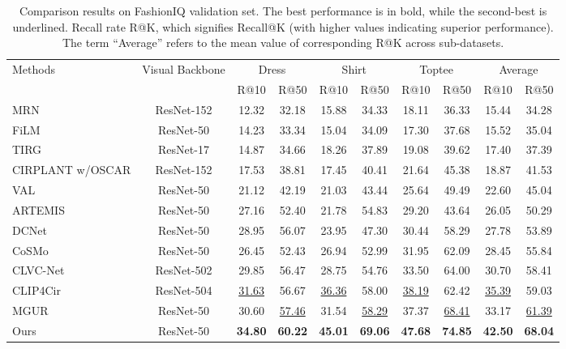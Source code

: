 \documentclass[letterpaper]{article} \usepackage{aaai24}  \usepackage{times}  \usepackage{helvet}  \usepackage{courier}  \usepackage[hyphens]{url}  \usepackage{graphicx} \urlstyle{rm} \def\UrlFont{\rm}  \usepackage{natbib}  \usepackage{caption} \frenchspacing  \setlength{\pdfpagewidth}{8.5in} \setlength{\pdfpageheight}{11in} \usepackage{amsmath,amsfonts}
\begin{document}
\begin{table*}[htb]
\centering
\small
    \begin{tabular}{l|c|cccccc|cc}
    \toprule
    \multirow{2}{*}{Methods} & \multirow{2}{*}{Visual Backbone} & \multicolumn{2}{c}{Dress} & \multicolumn{2}{c}{Shirt} & \multicolumn{2}{c}{Toptee} & \multicolumn{2}{|c}{Average}\\
    \cmidrule{3-4} \cmidrule{5-6} \cmidrule{7-8} \cmidrule{9-10}
    \multirow{2}{*}{} & \multirow{2}{*}{} &  R@10 & R@50 & R@10 & R@50 & R@10 & R@50 & R@10 & R@50\\
    \midrule
    MRN \cite{MRN} & ResNet-152 & 12.32 & 32.18 & 15.88 & 34.33 & 18.11 & 36.33 & 15.44 & 34.28 \\
    FiLM \cite{perez2018film} & ResNet-50 & 14.23 & 33.34 & 15.04 & 34.09 & 17.30 & 37.68 & 15.52 & 35.04 \\
    TIRG \cite{TIRG} & ResNet-17 & 14.87 & 34.66 & 18.26 & 37.89 & 19.08 & 39.62 & 17.40 & 37.39 \\
    CIRPLANT w/OSCAR \cite{liu2021image} & ResNet-152 & 17.53 & 38.81 & 17.45 & 40.41 & 21.64 & 45.38 & 18.87 & 41.53 \\
    VAL \cite{Chen_2020_CVPR} & ResNet-50 & 21.12 & 42.19 & 21.03 & 43.44 & 25.64 & 49.49 & 22.60 & 45.04 \\
    ARTEMIS \cite{delmas2022artemis} & ResNet-50 & 27.16 & 52.40 & 21.78 & 54.83 & 29.20 & 43.64 & 26.05 & 50.29 \\
    DCNet \cite{kim:2021:AAAI} & ResNet-50 & 28.95 & 56.07 & 23.95 & 47.30 & 30.44 & 58.29 & 27.78 & 53.89 \\
    CoSMo \cite{2021CoSMo} & ResNet-50 & 26.45 & 52.43 & 26.94 & 52.99 & 31.95 & 62.09 & 28.45 & 55.84 \\
    CLVC-Net \cite{CLVC-Net} & ResNet-502 & 29.85 & 56.47 & 28.75 & 54.76 & 33.50 & 64.00 & 30.70 & 58.41 \\
    CLIP4Cir \cite{Baldrati2022combiner} & ResNet-504 & \underline{31.63} & 56.67 & \underline{36.36} & 58.00 & \underline{38.19} & 62.42 & \underline{35.39} & 59.03 \\
    MGUR \cite{chen2022composed} & ResNet-50 & {{30.60}} & \underline{{57.46}} & {31.54} & \underline{58.29} & {{37.37}} & \underline{{68.41}} & {{33.17}} & \underline{{61.39}}\\
    \midrule
Ours & ResNet-50 & \textbf{{34.80}} & \textbf{{60.22}} & \textbf{45.01} & \textbf{69.06} & \textbf{{47.68}} & \textbf{{74.85}} & \textbf{{42.50}} & \textbf{{68.04}}\\
    \bottomrule
    \end{tabular}
    \caption{Comparison results on FashionIQ validation set. The best performance is in bold, while the second-best is underlined. 
    Recall rate R@K, which signifies Recall@K (with higher values indicating superior performance). 
    The term ``Average'' refers to the mean value of corresponding R@K across sub-datasets.} 
    \label{tab:Recall rates on fashionIQ}
\end{table*}
\end{document}
